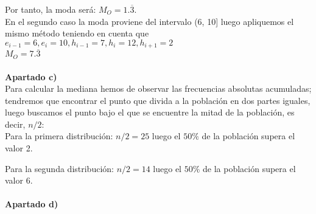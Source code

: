 Por tanto, la moda será: $M_O = 1.\overline{3}$.\\


En el segundo caso la moda proviene del intervalo (6, 10] luego apliquemos el mismo método teniendo en cuenta que $e_{i-1} = 6, e_i=10, h_{i-1} = 7, h_i = 12, h_{i+1} = 2 $ \\ 
$M_O = 7.\overline{3}$\\
\\

\textbf{Apartado c)}\\

Para calcular la mediana hemos de observar las frecuencias absolutas acumuladas; tendremos que encontrar el punto que divida a la población en dos partes iguales, luego buscamos el punto bajo el que se encuentre la mitad de la población, es decir, $n/2$:\\

Para la primera distribución: $n/2 = 25$ luego el $50\%$ de la población supera el valor 2.

Para la segunda distribución: $n/2 = 14$ luego el $50\%$ de la población supera el valor 6.\\
\\

\textbf{Apartado d)}\\


